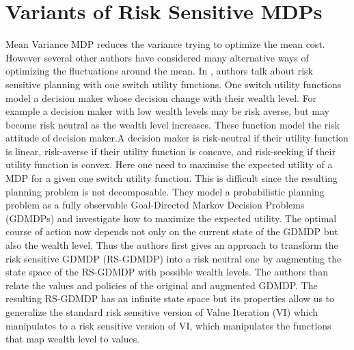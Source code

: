 \documentclass[11pt,a4paper,oneside]{report}
\begin{document}
\section{Variants of Risk Sensitive MDPs}
Mean Variance MDP reduces the variance trying to optimize the mean cost. However several other authors have considered many alternative ways of optimizing the fluctuations around the mean.
In \cite{liu2005risk}, authors talk about risk sensitive planning with one switch utility functions. One switch utility functions model a decision maker whose decision change with their wealth level. For example a decision maker with low wealth levels may be risk averse, but may become risk neutral as the wealth level increases. These function model the risk attitude of decision maker.A decision maker is risk-neutral if their utility function is linear, risk-averse if their utility function is concave, and risk-seeking if their utility function is convex. Here one need to maximise the expected utility of a MDP for a given one switch utility function. This is difficult since the resulting planning problem is not decomposable. They model a probabilistic planning problem as a fully observable Goal-Directed Markov Decision Problems (GDMDPs) and investigate how to maximize the expected utility. The optimal course of action now depends not only on the current state of the GDMDP but also the wealth level. Thus the authors first gives an approach to transform the risk sensitive GDMDP (RS-GDMDP) into a risk neutral one by augmenting the state space of the RS-GDMDP with possible wealth levels. The authors than relate the values and policies of the original and augmented GDMDP.  The resulting RS-GDMDP has an infinite state space but its properties allow us to generalize the standard risk sensitive version of Value Iteration (VI) which manipulates to a risk sensitive version of VI, which manipulates the functions that map wealth level to values.\\
\end{document}
